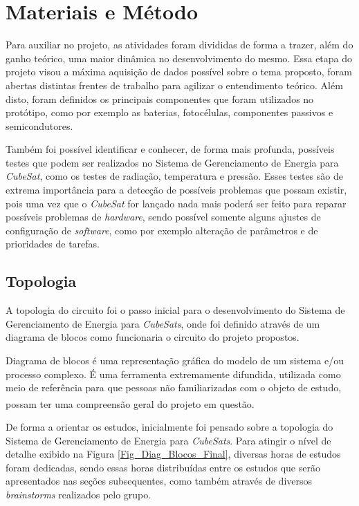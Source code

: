 \documentclass[
	12pt,				%
	openright,			%
	oneside,			%
	a4paper,			%
	english,			%
	french,				%
	spanish,			%
	brazil,				%
	oldfontcommands
	]{abntex2}
\begin{document}
\chapter[Materiais e Método]{Materiais e Método}

	Para auxiliar no projeto, as atividades foram divididas de forma a trazer, além do ganho teórico, uma maior dinâmica no desenvolvimento do mesmo. Essa etapa do projeto visou a máxima aquisição de dados possível sobre o tema proposto, foram abertas distintas frentes de trabalho para agilizar o entendimento teórico. Além disto, foram definidos os principais componentes que foram utilizados no protótipo, como por exemplo as baterias, fotocélulas, componentes passivos e semicondutores.
	
	Também foi possível identificar e conhecer, de forma mais profunda, possíveis testes que podem ser realizados no Sistema de Gerenciamento de Energia para \textit{CubeSat}, como os testes de radiação, temperatura e pressão. Esses testes são de extrema importância para a detecção de possíveis problemas que possam existir, pois uma vez que o \textit{CubeSat} for lançado nada mais poderá ser feito para reparar possíveis problemas de \textit{hardware}, sendo possível somente alguns ajustes de configuração de \textit{software}, como por exemplo alteração de parâmetros e de prioridades de tarefas.
	
\section[Topologia]{Topologia}

	A topologia do circuito foi o passo inicial para o desenvolvimento do Sistema de Gerenciamento de Energia para \textit{CubeSats}, onde foi definido através de um diagrama de blocos como funcionaria o circuito do projeto propostos.
	
	Diagrama de blocos é uma representação gráfica do modelo de um sistema e/ou processo complexo. É uma ferramenta extremamente difundida, utilizada como meio de referência para que pessoas não familiarizadas com o objeto de estudo, possam ter uma compreensão geral do projeto em questão.\textsuperscript{\cite{Diag_Blocos}}	
		
	De forma a orientar os estudos, inicialmente foi pensado sobre a topologia do Sistema de Gerenciamento de Energia para \textit{CubeSats}. Para atingir o nível de detalhe exibido na Figura \ref{Fig_Diag_Blocos_Final}, diversas horas de estudos foram dedicadas, sendo essas horas distribuídas entre os estudos que serão apresentados nas seções subsequentes, como também através de diversos \textit{brainstorms} realizados pelo grupo.
\end{document}
